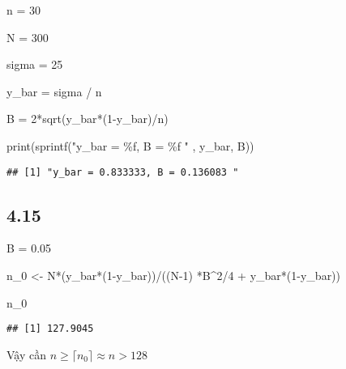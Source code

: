 \documentclass[
]{article}
\newenvironment{Shaded}{\begin{snugshade}}{\end{snugshade}}
\newcommand{\DecValTok}[1]{\textcolor[rgb]{0.00,0.00,0.81}{#1}}
\newcommand{\FloatTok}[1]{\textcolor[rgb]{0.00,0.00,0.81}{#1}}
\newcommand{\FunctionTok}[1]{\textcolor[rgb]{0.00,0.00,0.00}{#1}}
\newcommand{\NormalTok}[1]{#1}
\newcommand{\OtherTok}[1]{\textcolor[rgb]{0.56,0.35,0.01}{#1}}
\newcommand{\SpecialCharTok}[1]{\textcolor[rgb]{0.00,0.00,0.00}{#1}}
\newcommand{\StringTok}[1]{\textcolor[rgb]{0.31,0.60,0.02}{#1}}
\begin{document}
\begin{Shaded}
\begin{Highlighting}[]
\NormalTok{n }\OtherTok{=} \DecValTok{30}

\NormalTok{N }\OtherTok{=} \DecValTok{300}

\NormalTok{sigma }\OtherTok{=} \DecValTok{25}

\NormalTok{y\_bar }\OtherTok{=}\NormalTok{ sigma }\SpecialCharTok{/}\NormalTok{ n}

\NormalTok{B }\OtherTok{=} \DecValTok{2}\SpecialCharTok{*}\FunctionTok{sqrt}\NormalTok{(y\_bar}\SpecialCharTok{*}\NormalTok{(}\DecValTok{1}\SpecialCharTok{{-}}\NormalTok{y\_bar)}\SpecialCharTok{/}\NormalTok{n)}

\FunctionTok{print}\NormalTok{(}\FunctionTok{sprintf}\NormalTok{(}\StringTok{"y\_bar = \%f, B = \%f "}\NormalTok{ , y\_bar, B))}
\end{Highlighting}
\end{Shaded}

\begin{verbatim}
## [1] "y_bar = 0.833333, B = 0.136083 "
\end{verbatim}

\hypertarget{section-3}{%
\subsection{4.15}\label{section-3}}

\begin{Shaded}
\begin{Highlighting}[]
\NormalTok{B }\OtherTok{=} \FloatTok{0.05}

\NormalTok{n\_0 }\OtherTok{\textless{}{-}}\NormalTok{ N}\SpecialCharTok{*}\NormalTok{(y\_bar}\SpecialCharTok{*}\NormalTok{(}\DecValTok{1}\SpecialCharTok{{-}}\NormalTok{y\_bar))}\SpecialCharTok{/}\NormalTok{((N}\DecValTok{{-}1}\NormalTok{) }\SpecialCharTok{*}\NormalTok{B}\SpecialCharTok{\^{}}\DecValTok{2}\SpecialCharTok{/}\DecValTok{4} \SpecialCharTok{+}\NormalTok{ y\_bar}\SpecialCharTok{*}\NormalTok{(}\DecValTok{1}\SpecialCharTok{{-}}\NormalTok{y\_bar))}

\NormalTok{n\_0}
\end{Highlighting}
\end{Shaded}

\begin{verbatim}
## [1] 127.9045
\end{verbatim}

Vậy cần \(n \ge \lceil n_0 \rceil \approx n > 128\)
\end{document}
